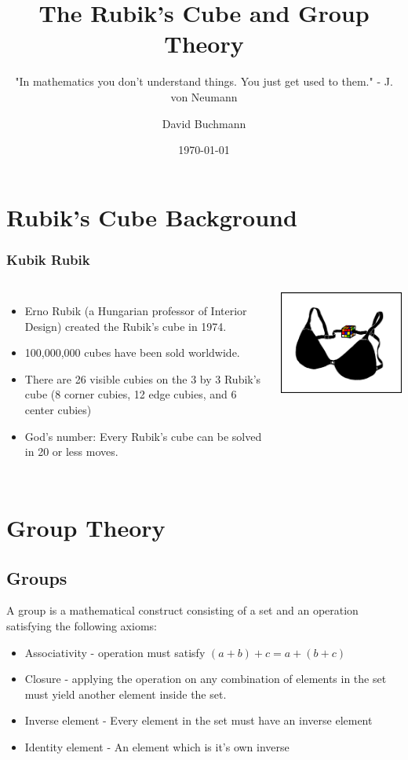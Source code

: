 \documentclass[xcolor=pdftex,dvipsnames,table]{beamer}
\title{The Rubik's Cube and Group Theory}
\subtitle{"In mathematics you don’t understand things. You just get used to them." - J. von Neumann}
\author{David Buchmann}
\institute{Cisco Systems}
\date{\today}
\begin{document}
\maketitle

\section{Rubik's Cube Background}
\begin{frame}
  \frametitle{Kubik Rubik}
  \begin{columns}[cc]
    \column{2.5in}
    \begin{itemize}
    \item Erno Rubik (a Hungarian professor of Interior Design) created the Rubik's cube in 1974.
    \item 100,000,000 cubes have been sold worldwide.
    \item There are 26 visible cubies on the 3 by 3 Rubik's cube (8 corner cubies, 12 edge cubies, and 6 center cubies)
    \item God's number: Every Rubik's cube can be solved in 20 or less moves.
  \end{itemize}
    \column{0.5in}
    \includegraphics[scale=0.33]{rubik_frustration.png}
  \end{columns}
\end{frame}

\section{Group Theory}
\subsection{Groups}
\begin{frame}
  A group is a mathematical construct consisting of a set and an operation satisfying the following axioms:
  \begin{itemize}
    \item Associativity - operation must satisfy $(a + b) + c = a + (b + c)$
    \item Closure - applying the operation on any combination of elements in the set must yield another element inside the set.
    \item Inverse element - Every element in the set must have an inverse element
    \item Identity element - An element which is it's own inverse
  \end{itemize}
\end{frame}
\end{document}
